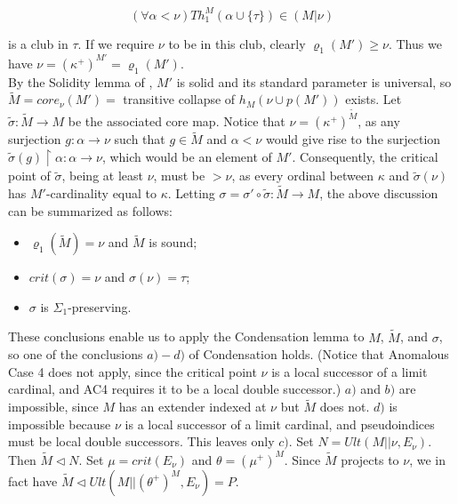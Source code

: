 \documentclass[12pt]{article}
\begin{document}
\[
( \forall \alpha < \nu ) Th_1^{M} (\alpha \cup \{ \tau \} ) \in (M | \nu )
\]

is a club in $\tau$.  If we require $\nu$ to be in this club, clearly $\varrho_1 (M') \geq \nu$.  Thus we have $\nu = ( \kappa^+ )^{M' } = \varrho_1 (M')$.\\

By the Solidity lemma of \cite{FSPIPM}, $M'$ is solid and its standard parameter is universal, so $\tilde{M} = core_\nu (M' ) =$ transitive collapse of $h_M ( \nu \cup p(M') )$ exists.  Let $\tilde{\sigma} : \tilde{M} \longrightarrow M$ be the associated core map.  Notice that $\nu = (\kappa^+)^{\tilde{M}}$, as any surjection $g: \alpha \longrightarrow \nu$ such that $g \in \tilde{M}$ and $\alpha < \nu$ would give rise to the surjection $\tilde{\sigma} (g) \restriction \alpha : \alpha \longrightarrow \nu$, which would be an element of $M'$. Consequently, the critical point of $\tilde{\sigma }$, being at least $\nu$, must be $> \nu$, as every ordinal between $\kappa$ and $\tilde{\sigma} (\nu)$ has $M'$-cardinality equal to $\kappa$.  Letting $\sigma = \sigma' \circ \tilde{\sigma}: \tilde{M} \longrightarrow M$, the above discussion can be summarized as follows:

\begin{itemize}
\item{$\varrho_1 (\tilde{M} ) = \nu$ and $\tilde{M}$ is sound;}
\item{$crit (\sigma )= \nu$ and $\sigma (\nu ) = \tau$;}
\item{$\sigma$ is $\Sigma_1$-preserving.}
\end{itemize}



These conclusions enable us to apply the Condensation lemma to $M$, $\tilde{M}$, and $\sigma$, so one of the conclusions $a) - d)$ of Condensation holds.  (Notice that Anomalous Case 4 does not apply, since the critical point $\nu$ is a local successor of a limit cardinal, and AC4 requires it to be a local double successor.)  $a)$ and $b)$ are impossible, since $M$ has an extender indexed at $\nu$ but $\tilde{M}$ does not.  $d)$ is impossible because $\nu$ is a local successor of a limit cardinal, and pseudoindices must be local double successors.  This leaves only $c)$.  Set $N = Ult (M || \nu , E_\nu )$.  Then $\tilde{M} \lhd N$.  Set $\mu = crit( E_\nu )$ and $\theta = ( \mu^+ )^M$.  Since $\tilde{M}$ projects to $\nu$, we in fact have $\tilde{M} \lhd Ult ( M || ( \theta^+ )^M , E_\nu ) = P$.\\
\end{document}
